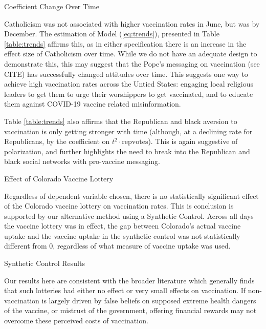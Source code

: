 \documentclass[12pt]{article}
\begin{document}
\begin{spacing}{1.5}
		\begin{table}
			\centering
			\caption{Coefficient Change Over Time}
			
			\label{table:trends}
		\end{table}
		
		Catholicism was not associated with higher vaccination rates in June, but was by December. The estimation of Model (\ref{eq:trends}), presented in Table \ref{table:trends} affirms this, as in either specification there is an increase in the effect size of Catholicism over time. While we do not have an adequate design to demonstrate this, this may suggest that the Pope's messaging on vaccination (see CITE) has successfully changed attitudes over time. This suggests one way to achieve high vaccination rates across the Untied States: engaging local religious leaders to get them to urge their worshippers to get vaccinated, and to educate them against COVID-19 vaccine related misinformation.
		
		Table \ref{table:trends} also affirms that the Republican and black aversion to vaccination is only getting stronger with time (although, at a declining rate for Republicans, by the coefficient on $t^2\cdot \textrm{repvotes}$). This is again suggestive of polarization, and further highlights the need to break into the Republican and black social networks with pro-vaccine messaging.
		
		\begin{table}
			\centering
			\caption{Effect of Colorado Vaccine Lottery}
			\centerline{}
			\label{table:didresults}
		\end{table}
		
		Regardless of dependent variable chosen, there is no statistically significant effect of the Colorado vaccine lottery on vaccination rates. This is conclusion is supported by our alternative method using a Synthetic Control. Across all days the vaccine lottery was in effect, the gap between Colorado's actual vaccine uptake and the vaccine uptake in the synthetic control was not statistically different from 0, regardless of what measure of vaccine uptake was used.
		
		\begin{table}
			\caption{Synthetic Control Results}
			
		\end{table}
		
		Our results here are consistent with the broader literature which generally finds that such lotteries had either no effect or very small effects on vaccination. If non-vaccination is largely driven by false beliefs on supposed extreme health dangers of the vaccine, or mistrust of the government, offering financial rewards may not overcome these perceived costs of vaccination.
		

\end{spacing}
\end{document}
